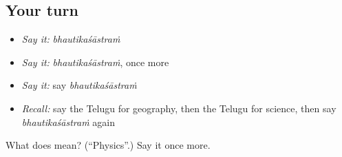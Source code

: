\subsection*{Your turn}
\begin{itemize}
\raggedright
  \item \emph{Say it:} \emph{bhautikaśāstraṁ}
  \item \emph{Say it:} \emph{bhautikaśāstraṁ}, once more
  \item \emph{Say it:} say \emph{bhautikaśāstraṁ}
  \item \emph{Recall:} say the Telugu for geography, then the Telugu for science, then say \emph{bhautikaśāstraṁ} again
\end{itemize}

\begin{tcolorbox}[breakable,colback=teal!4,colframe=teal!35!black,title={Before you move on}]
What does  mean? (\textquotedblleft{}Physics\textquotedblright{}.) Say it once more.
\end{tcolorbox}
